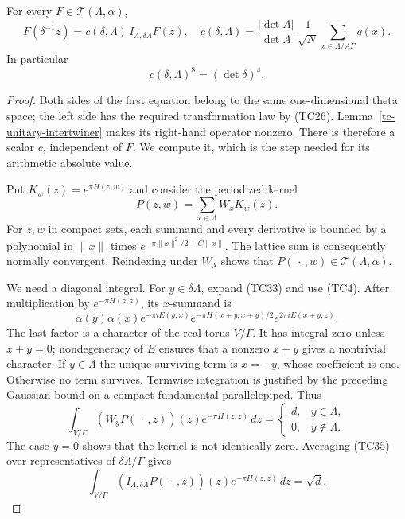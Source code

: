 \begin{theorem}\label{tc-unitary-constant}
For every $F\in\mathcal T(\Lambda,\alpha)$,
\[
 F(\delta^{-1}z)=
       c(\delta,\Lambda)\,I_{\Lambda,\delta\Lambda}F(z),
 \quad
 c(\delta,\Lambda)=
 \frac{|\det A|}{\det A}\,
         \frac1{\sqrt N}\sum_{x\in\Lambda/A\Gamma}q(x).
 \tag{TC31}
\]
In particular
\[
                         c(\delta,\Lambda)^8=(\det\delta)^4.
 \tag{TC32}
\]
\end{theorem}
\begin{proof}
Both sides of the first equation belong to the same
one-dimensional theta space; the left side has the required
transformation law by (TC26).  Lemma~\ref{tc-unitary-intertwiner}
makes its right-hand operator nonzero.
There is therefore a scalar $c$, independent of $F$.
We compute it, which is the step needed for its arithmetic
absolute value.

Put $K_w(z)=e^{\pi H(z,w)}$ and consider the periodized kernel
\[
                       P(z,w)=\sum_{x\in\Lambda}W_xK_w(z).
 \tag{TC33}
\]
For $z,w$ in compact sets, each summand and every derivative
is bounded by a polynomial in $\|x\|$ times
$e^{-\pi\|x\|^2/2+C\|x\|}$.
The lattice sum is consequently normally convergent.
Reindexing under $W_\lambda$ shows that
$P(\,\cdot\,,w)\in\mathcal T(\Lambda,\alpha)$.

We need a diagonal integral.  For $y\in\delta\Lambda$,
expand (TC33) and use (TC4).  After multiplication by
$e^{-\pi H(z,z)}$, its $x$-summand is
\[
 \alpha(y)\alpha(x)e^{-\pi iE(y,x)}
       e^{-\pi H(x+y,x+y)/2}e^{2\pi iE(x+y,z)}.
 \tag{TC34}
\]
The last factor is a character of the real torus $V/\Gamma$.
It has integral zero unless $x+y=0$; nondegeneracy of $E$
ensures that a nonzero $x+y$ gives a nontrivial character.
If $y\in\Lambda$ the unique surviving term is $x=-y$,
whose coefficient is one.  Otherwise no term survives.
Termwise integration is justified by the preceding Gaussian
bound on a compact fundamental parallelepiped.  Thus
\[
 \int_{V/\Gamma}(W_yP(\,\cdot\,,z))(z)
                        e^{-\pi H(z,z)}\,dz
     =\begin{cases}d,&y\in\Lambda,\\0,&y\notin\Lambda.\end{cases}
 \tag{TC35}
\]
The case $y=0$ shows that the kernel is not identically zero.
Averaging (TC35) over representatives of $\delta\Lambda/\Gamma$
gives
\[
 \int_{V/\Gamma}
   (I_{\Lambda,\delta\Lambda}P(\,\cdot\,,z))(z)
                          e^{-\pi H(z,z)}\,dz=\sqrt d.
 \tag{TC36}
\]


\end{proof}
